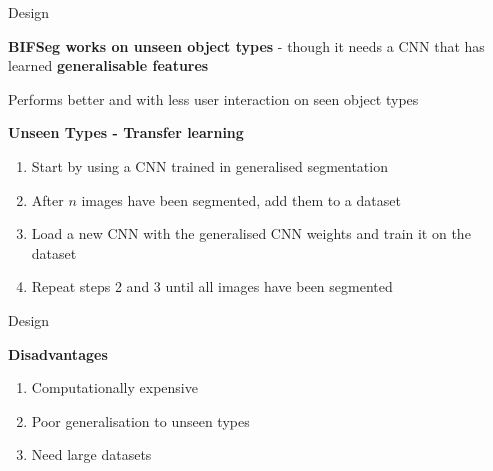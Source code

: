 \documentclass[10pt]{beamer}
\begin{document}
\begin{frame}[fragile]{Design}

  \textbf{BIFSeg works on unseen object types} - though it
  needs a CNN that has learned \textbf{generalisable features}

  Performs better and with less user interaction on seen object types

  \pause
  \textbf{Unseen Types - Transfer learning}
  \begin{enumerate}
  \item Start by using a CNN trained in generalised segmentation
  \item After $n$ images have been segmented, add them to a dataset
  \item Load a new CNN with the generalised CNN weights and train it on the dataset
  \item Repeat steps 2 and 3 until all images have been segmented
  \end{enumerate}

\end{frame}

  


\begin{frame}[fragile]{Design}
  

  \textbf{Disadvantages}
  \begin{enumerate}
  \item Computationally expensive 
  \item Poor generalisation to unseen types 
  \item Need large datasets  
  \end{enumerate}
  
\end{frame}
\end{document}
